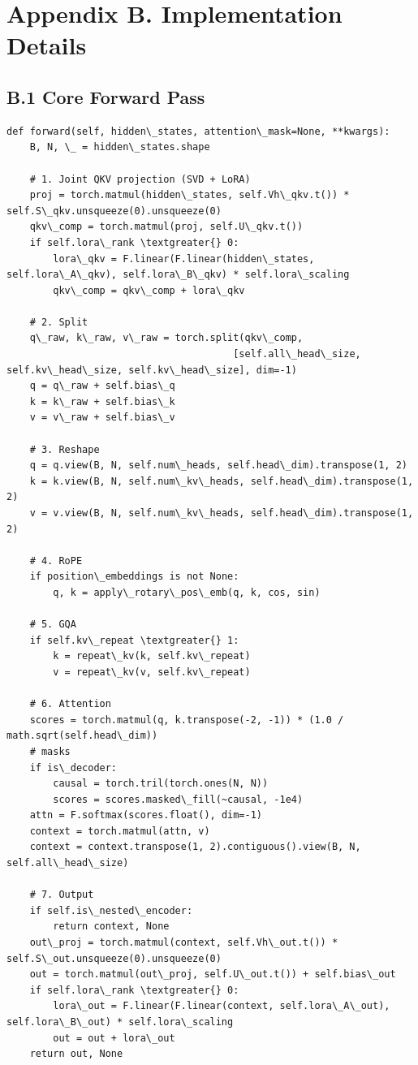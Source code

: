 \section{Appendix B. Implementation Details}

\subsection{B.1 Core Forward Pass}

\begin{lstlisting}
def forward(self, hidden\_states, attention\_mask=None, **kwargs):
    B, N, \_ = hidden\_states.shape
    
    # 1. Joint QKV projection (SVD + LoRA)
    proj = torch.matmul(hidden\_states, self.Vh\_qkv.t()) * self.S\_qkv.unsqueeze(0).unsqueeze(0)
    qkv\_comp = torch.matmul(proj, self.U\_qkv.t())
    if self.lora\_rank \textgreater{} 0:
        lora\_qkv = F.linear(F.linear(hidden\_states, self.lora\_A\_qkv), self.lora\_B\_qkv) * self.lora\_scaling
        qkv\_comp = qkv\_comp + lora\_qkv
    
    # 2. Split
    q\_raw, k\_raw, v\_raw = torch.split(qkv\_comp, 
                                       [self.all\_head\_size, self.kv\_head\_size, self.kv\_head\_size], dim=-1)
    q = q\_raw + self.bias\_q
    k = k\_raw + self.bias\_k
    v = v\_raw + self.bias\_v
    
    # 3. Reshape
    q = q.view(B, N, self.num\_heads, self.head\_dim).transpose(1, 2)
    k = k.view(B, N, self.num\_kv\_heads, self.head\_dim).transpose(1, 2)
    v = v.view(B, N, self.num\_kv\_heads, self.head\_dim).transpose(1, 2)
    
    # 4. RoPE
    if position\_embeddings is not None:
        q, k = apply\_rotary\_pos\_emb(q, k, cos, sin)
    
    # 5. GQA
    if self.kv\_repeat \textgreater{} 1:
        k = repeat\_kv(k, self.kv\_repeat)
        v = repeat\_kv(v, self.kv\_repeat)
    
    # 6. Attention
    scores = torch.matmul(q, k.transpose(-2, -1)) * (1.0 / math.sqrt(self.head\_dim))
    # masks
    if is\_decoder:
        causal = torch.tril(torch.ones(N, N))
        scores = scores.masked\_fill(~causal, -1e4)
    attn = F.softmax(scores.float(), dim=-1)
    context = torch.matmul(attn, v)
    context = context.transpose(1, 2).contiguous().view(B, N, self.all\_head\_size)
    
    # 7. Output
    if self.is\_nested\_encoder:
        return context, None
    out\_proj = torch.matmul(context, self.Vh\_out.t()) * self.S\_out.unsqueeze(0).unsqueeze(0)
    out = torch.matmul(out\_proj, self.U\_out.t()) + self.bias\_out
    if self.lora\_rank \textgreater{} 0:
        lora\_out = F.linear(F.linear(context, self.lora\_A\_out), self.lora\_B\_out) * self.lora\_scaling
        out = out + lora\_out
    return out, None
\end{lstlisting}

